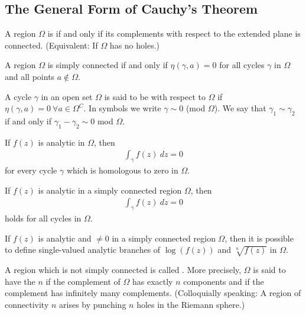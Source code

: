 \subsection{The General Form of Cauchy's Theorem}

\begin{definition}
    A region $\Omega$ is  if and only if its complements with respect to the
    extended plane is connected. (Equivalent: If $\Omega$ has no holes.)
\end{definition}

\begin{theorem}
    A region $\Omega$ is simply connected if and only if $\eta(\gamma,a) = 0$ for
    all cycles $\gamma$ in $\Omega$ and all points $a \notin \Omega$.
\end{theorem}

\begin{definition}[Homology]
    A cycle $\gamma$ in an open set $\Omega$ is said to be 
    with respect to $\Omega$ if $\eta(\gamma,a) = 0 \ \forall a \in \Omega^C$.
    In symbols we write $\gamma \sim 0$ (mod $\Omega$). We say that $\gamma_1 \sim \gamma_2$
    if and only if $\gamma_1 - \gamma_2 \sim 0$ mod $\Omega$.
\end{definition}

\begin{theorem}
    If $f(z)$ is analytic in $\Omega$, then
    \begin{align*}
        \int_\gamma f(z) \ dz = 0
    \end{align*}
    for every cycle $\gamma$ which is homologous to zero in $\Omega$.
\end{theorem}

\begin{corollary}
    If $f(z)$ is analytic in a simply connected region $\Omega$, then
    \begin{align*}
        \int_\gamma f(z) \ dz = 0
    \end{align*}
    holds for all cycles in $\Omega$.
\end{corollary}

\begin{corollary}
    If $f(z)$ is analytic and $\neq 0$ in a simply connected region $\Omega$,
    then it is possible to define single-valued analytic branches of $\log(f(z))$
    and $\sqrt[n]{f(z)}$ in $\Omega$.
\end{corollary}

\begin{definition}
    A region which is not simply connected is called .
    More precisely, $\Omega$ is said to have the  $n$ if
    the complement of $\Omega$ has exactly $n$ components and 
    if the complement has infinitely many complements. (Colloquially speaking:
    A region of connectivity $n$ arises by punching $n$ holes in the Riemann sphere.)
\end{definition}

